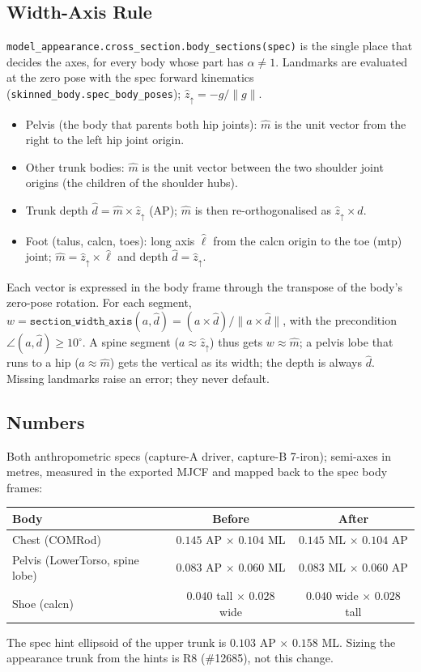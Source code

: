 \subsection{Width-Axis Rule}
\texttt{model\_appearance.cross\_section.body\_sections(spec)} is the single place
that decides the axes, for every body whose part has $\alpha\ne 1$. Landmarks are
evaluated at the zero pose with the spec forward kinematics
(\texttt{skinned\_body.spec\_body\_poses}); $\hat z_{\uparrow} = -g/\lVert g\rVert$.
\begin{itemize}
\item Pelvis (the body that parents both hip joints): $\hat m$ is the unit vector
  from the right to the left hip joint origin.
\item Other trunk bodies: $\hat m$ is the unit vector between the two shoulder
  joint origins (the children of the shoulder hubs).
\item Trunk depth $\hat d = \hat m\times\hat z_{\uparrow}$ (AP); $\hat m$ is then
  re-orthogonalised as $\hat z_{\uparrow}\times\hat d$.
\item Foot (talus, calcn, toes): long axis $\hat\ell$ from the calcn origin to the
  toe (mtp) joint; $\hat m = \hat z_{\uparrow}\times\hat\ell$ and depth
  $\hat d=\hat z_{\uparrow}$.
\end{itemize}
Each vector is expressed in the body frame through the transpose of the body's
zero-pose rotation. For each segment,
$w = \texttt{section\_width\_axis}(a,\hat d) = (a\times\hat d)/\lVert a\times\hat d\rVert$,
with the precondition $\angle(a,\hat d)\ge 10^\circ$. A spine segment
($a\approx\hat z_{\uparrow}$) thus gets $w\approx\hat m$; a pelvis lobe that runs
to a hip ($a\approx\hat m$) gets the vertical as its width; the depth is always
$\hat d$. Missing landmarks raise an error; they never default.

\subsection{Numbers}
Both anthropometric specs (capture-A driver, capture-B 7-iron); semi-axes in
metres, measured in the exported MJCF and mapped back to the spec body frames:
\begin{center}
\begin{tabular}{lcc}
Body & Before & After \\
\hline
Chest (COMRod) & $0.145$ AP $\times$ $0.104$ ML & $0.145$ ML $\times$ $0.104$ AP \\
Pelvis (LowerTorso, spine lobe) & $0.083$ AP $\times$ $0.060$ ML & $0.083$ ML $\times$ $0.060$ AP \\
Shoe (calcn) & $0.040$ tall $\times$ $0.028$ wide & $0.040$ wide $\times$ $0.028$ tall \\
\end{tabular}
\end{center}
The spec hint ellipsoid of the upper trunk is $0.103$ AP $\times$ $0.158$ ML.
Sizing the appearance trunk from the hints is R8 (\#12685), not this change.

